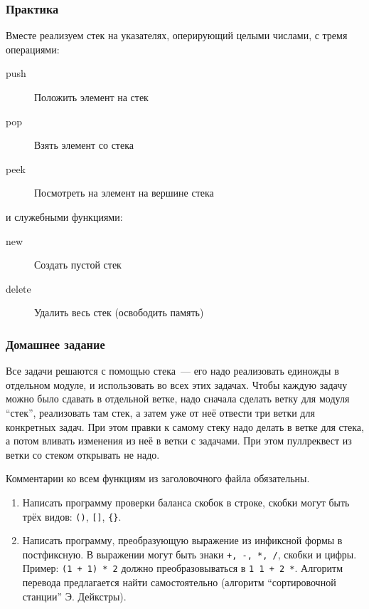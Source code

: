 \documentclass[aspectratio=169]{beamer}
\begin{document}
\begin{frame}
    \frametitle{Практика}

    Вместе реализуем стек на указателях, оперирующий целыми числами, с тремя операциями:
    \begin{description}
        \item[push] Положить элемент на стек
        \item[pop] Взять элемент со стека
        \item[peek] Посмотреть на элемент на вершине стека
    \end{description}
    и служебными функциями:
    \begin{description}
        \item[new] Создать пустой стек
        \item[delete] Удалить весь стек (освободить память)
    \end{description}

\end{frame}

\begin{frame}
    \frametitle{Домашнее задание}

    Все задачи решаются с помощью стека~--- его надо реализовать единожды в отдельном модуле, и использовать во всех этих задачах.
    Чтобы каждую задачу можно было сдавать в отдельной ветке, надо сначала сделать ветку для модуля \enquote{стек}, реализовать там стек, а затем уже от неё отвести три ветки для конкретных задач.
    При этом правки к самому стеку надо делать в ветке для стека, а потом вливать изменения из неё в ветки с задачами.
    При этом пуллреквест из ветки со стеком открывать не надо.

    Комментарии ко всем функциям из заголовочного файла обязательны.
    \begin{enumerate}
        \item Написать программу проверки баланса скобок в строке, скобки могут быть трёх видов: \texttt{()}, \texttt{[]}, \texttt{\{\}}.

        \item     Написать программу, преобразующую выражение из инфиксной формы в постфиксную.
              В выражении могут быть знаки \texttt{+, -, *, /}, скобки и цифры.
              Пример: \texttt{(1 + 1) * 2} должно преобразовываться в \texttt{1 1 + 2 *}.
              Алгоритм перевода предлагается найти самостоятельно (алгоритм \enquote{сортировочной станции} Э. Дейкстры).
    \end{enumerate}

\end{frame}
\end{document}
